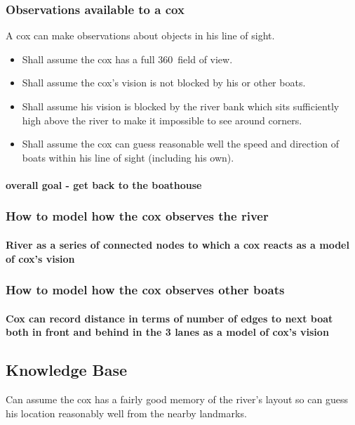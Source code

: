       \subsubsection{Observations available to a cox}
      A cox can make observations about objects in his line of sight.
      \begin{itemize}
        \item Shall assume the cox has a full 360\textdegree\ field of
          view.
        \item Shall assume the cox's vision is not blocked by his or other boats.
        \item Shall assume his
        vision is blocked by the river bank which sits sufficiently high
        above the river to make it impossible to see around corners.
        \item Shall assume the cox can guess reasonable well the speed and
        direction of boats within his line of sight (including his own).
      \end{itemize}
        \paragraph{overall goal - get back to the boathouse}
      \subsubsection{How to model how the cox observes the river}
        \paragraph{River as a series of connected nodes to which a cox reacts as a model of cox's vision}
      \subsubsection{How to model how the cox observes other boats}
        \paragraph{Cox can record distance in terms of number of edges to next boat both in front and behind in the 3 lanes as a model of cox's vision}
      \subsection{Knowledge Base} 
      Can assume the cox has a fairly good memory of the river's layout so can guess his location reasonably well from the nearby landmarks.
  
